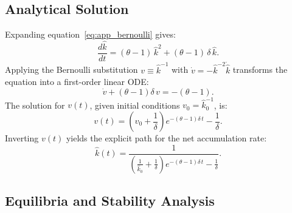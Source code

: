 \subsection{Analytical Solution}
\label{app:solution}

Expanding equation~\eqref{eq:app_bernoulli} gives:
\begin{equation}\label{eq:app_expanded}
    \frac{d\hat{k}}{dt} = (\theta - 1)\,\hat{k}^2 + (\theta - 1)\,\delta\,\hat{k}.
\end{equation}
Applying the Bernoulli substitution $v \equiv \hat{k}^{-1}$ with $\dot{v} = -\hat{k}^{-2}\dot{\hat{k}}$ transforms the equation into a first-order linear ODE:
\begin{equation}\label{eq:app_linear_standard}
    \dot{v} + (\theta - 1)\delta\,v = -(\theta - 1).
\end{equation}
The solution for $v(t)$, given initial conditions $v_0 = \hat{k}_0^{-1}$, is:
\begin{equation}\label{eq:app_v_simplified}
    v(t) = \left(v_0 + \frac{1}{\delta}\right) e^{-(\theta-1)\delta\,t} - \frac{1}{\delta}.
\end{equation}
Inverting $v(t)$ yields the explicit path for the net accumulation rate:
\begin{equation}\label{eq:app_khat_solution}
    \boxed{\hat{k}(t) = \frac{1}{\left(\frac{1}{\hat{k}_0} + \frac{1}{\delta}\right) e^{-(\theta-1)\delta\,t} - \frac{1}{\delta}}}.
\end{equation}

\subsection{Equilibria and Stability Analysis}
\label{app:stability}

